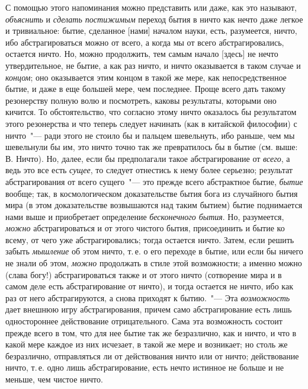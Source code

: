 С помощью этого напоминания можно представить
или даже, как это называют, \emph{объяснить}\endnotemark{} и \emph{сделать постижимым}
переход бытия в ничто как нечто даже легкое
и тривиальное: бытие, сделанное [нами] началом науки,
есть, разумеется, ничто, ибо абстрагироваться можно от
всего, а когда мы от всего абстрагировались, остается ничто.
Но, можно продолжить, тем самым начало [здесь] не
нечто утвердительное, не бытие, а как раз ничто, и ничто
оказывается в таком случае и \emph{концом}; оно оказывается
этим концом в такой же мере, как непосредственное бытие,
и даже в еще большей мере, чем последнее. Проще
всего дать такому резонерству полную волю и посмотреть,
каковы результаты, которыми оно кичится. То обстоятельство,
что согласно этому ничто оказалось бы результатом
этого резонерства и что теперь следует начинать (как в
китайской философии) с ничто~"--- ради этого не стоило бы
и пальцем шевельнуть, ибо раньше, чем мы шевельнули
бы им, это ничто точно так же превратилось бы в бытие
(см. выше: В. Ничто). Но, далее, если бы предполагали
такое абстрагирование от \emph{всего}, а ведь это все есть \emph{сущее},
то следует отнестись к нему более серьезно; результат
абстрагирования от всего сущего~"--- это прежде всего абстрактное
бытие, \emph{бытие} вообще; так, в космологическом
доказательстве бытия бога из случайного бытия мира
(в этом доказательстве возвышаются над таким бытием)
бытие поднимается нами выше и приобретает определение
\emph{бесконечного бытия}. Но, разумеется, \emph{можно} абстрагироваться
и от этого чистого бытия, присоединить и бытие
ко всему, от чего уже абстрагировались; тогда остается
ничто. Затем, если решить забыть \emph{мышление} об этом ничто,
т.\,е. о его переходе в бытие, или если бы ничего не
знали об этом, \emph{можно} продолжать в стиле этой возможности;
а именно можно (слава богу!) абстрагироваться также
и от этого ничто (сотворение мира и в самом деле есть
абстрагирование от ничто), и тогда остается не ничто,
ибо как раз от него абстрагируются, а снова приходят к
бытию.~"--- Эта \emph{возможность} дает внешнюю игру абстрагирования,
причем само абстрагирование есть лишь одностороннее
действование отрицательного. Сама эта возможность
состоит прежде всего в том, что для нее бытие так
же безразлично, как и ничто, и что в какой мере каждое
из них исчезает, в такой же мере и возникает; но столь
же безразлично, отправляться ли от действования ничто
или от ничто; действование ничто, т.\,е. одно лишь абстрагирование,
есть нечто истинное не больше и не меньше,
чем чистое ничто.


